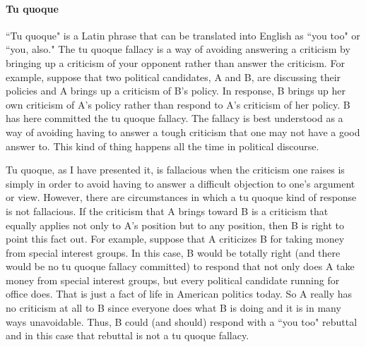 
\paragraph{Tu quoque}
``Tu quoque" is a Latin phrase that can be translated into English as ``you too"
or ``you, also." The tu quoque fallacy is a way of avoiding answering a criticism
by bringing up a criticism of your opponent rather than answer the criticism. For
example, suppose that two political candidates, A and B, are discussing their
policies and A brings up a criticism of B's policy. In response, B brings up her
own criticism of A's policy rather than respond to A's criticism of her policy. B
has here committed the tu quoque fallacy. The fallacy is best understood as a
way of avoiding having to answer a tough criticism that one may not have a
good answer to. This kind of thing happens all the time in political discourse.

Tu quoque, as I have presented it, is fallacious when the criticism one raises is
simply in order to avoid having to answer a difficult objection to one's argument
or view. However, there are circumstances in which a tu quoque kind of
response is not fallacious. If the criticism that A brings toward B is a criticism
that equally applies not only to A's position but to any position, then B is right to
point this fact out. For example, suppose that A criticizes B for taking money
from special interest groups. In this case, B would be totally right (and there
would be no tu quoque fallacy committed) to respond that not only does A take
money from special interest groups, but every political candidate running for
office does. That is just a fact of life in American politics today. So A really has
no criticism at all to B since everyone does what B is doing and it is in many
ways unavoidable. Thus, B could (and should) respond with a ``you too" rebuttal
and in this case that rebuttal is not a tu quoque fallacy.

